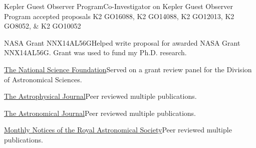 \documentclass[10pt,a4paper]{article}
\begin{document}

\inlineheadsection
  {Kepler Guest Observer Program}{Co-Investigator on Kepler Guest Observer Program accepted proposals K2 GO16088, K2 GO14088, K2 GO12013, K2 GO8052, \& K2 GO10052}

\inlineheadsection
  {NASA Grant NNX14AL56G}{Helped write proposal for awarded NASA Grant NNX14AL56G. Grant was used to fund my Ph.D. research.}




\inlineheadsection
  {\href{https://www.nsf.gov/}{The National Science Foundation}}{Served on a grant review panel for the Division of Astronomical Sciences.}

\inlineheadsection
  {\href{http://iopscience.iop.org/journal/0004-637X}{The Astrophysical Journal}}{Peer reviewed multiple publications.}

\inlineheadsection
  {\href{https://iopscience.iop.org/journal/1538-3881}{The Astronomical Journal}}{Peer reviewed multiple publications.}

\inlineheadsection
  {\href{https://academic.oup.com/mnras}{Monthly Notices of the Royal Astronomical Society}}{Peer reviewed multiple publications.}






\end{document}
